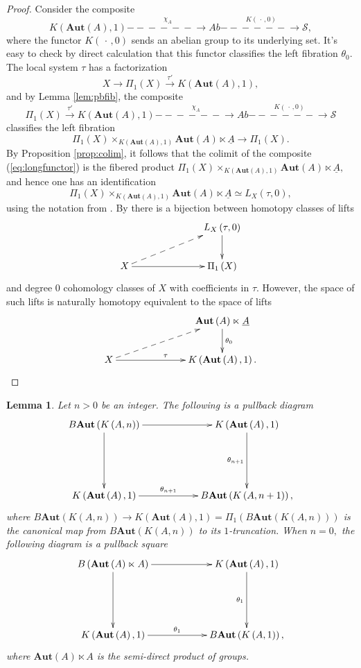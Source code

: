 \documentclass[12pt]{amsart}
\newtheorem{lemma}[dummy]{Lemma}
\theoremstyle{definition}
\newcommand{\cS}{\mathcal{S}}
\def\blank{\mspace{3mu}\cdot\mspace{3mu}}
\def\Aut{\mathbf{Aut}}
\def\longlongrightarrow{-\!\!\!-\!\!\!-\!\!\!-\!\!\!-\!\!\!-\!\!\!\longrightarrow}
\begin{document}
\begin{proof}
Consider the composite
$$K\left(\Aut\left(A\right),1\right) \stackrel{\chi_A}{\longlongrightarrow} Ab \stackrel{K\left(\blank,0\right)}{\longlongrightarrow} \cS,$$ where the functor $K\left(\blank,0\right)$ sends an abelian group to its underlying set. It's easy to check by direct calculation that this functor classifies the left fibration $\theta_0.$ The local system $\tau$ has a factorization
$$X \to \Pi_1\left(X\right) \stackrel{\tau'}{\longrightarrow} K\left(\Aut\left(A\right),1\right),$$ and by Lemma \ref{lem:pbfib}, the composite
\begin{equation}\label{eq:longfunctor}
\Pi_1\left(X\right) \stackrel{\tau'}{\longrightarrow} K\left(\Aut\left(A\right),1\right) \stackrel{\chi_A}{\longlongrightarrow} Ab \stackrel{K\left(\blank,0\right)}{\longlongrightarrow} \cS
\end{equation}
classifies the left fibration $$\Pi_1\left(X\right) \times_{K\left(\Aut\left(A\right),1\right) } \Aut\left(A\right) \ltimes \underline{A} \to \Pi_1\left(X\right).$$ By Proposition \ref{prop:colim}, it follows that the colimit of the composite (\ref{eq:longfunctor}) is the fibered product $\Pi_1\left(X\right) \times_{K\left(\Aut\left(A\right),1\right) } \Aut\left(A\right) \ltimes \underline{A},$ and hence one has an identification
$$\Pi_1\left(X\right) \times_{K\left(\Aut\left(A\right),1\right) } \Aut\left(A\right) \ltimes \underline{A} \simeq L_{X}\left(\tau,0\right),$$ using the notation from \cite[Definition 3.1]{coh}. By \cite[Corollary 4.6]{coh} there is a bijection between homotopy classes of lifts
$$\xymatrix@C=2.5cm{& L_X\left(\tau,0\right) \ar[d]\\
X \ar[r] \ar@{-->}[ru]& \Pi_1\left(X\right)}$$
and degree $0$ cohomology classes of $X$ with coefficients in $\tau.$ However, the space of such lifts is naturally homotopy equivalent to the space of lifts
$$\xymatrix@C=2.5cm{&  \Aut\left(A\right) \ltimes \underline{A} \ar^-{\theta_0}[d]\\
X \ar[r]^{\tau} \ar@{-->}[ru]& K\left(\Aut\left(A\right),1\right).}$$
\end{proof}

\begin{lemma}\label{lem:univpb}
Let $n>0$ be an integer. The following is a pullback diagram
$$\xymatrix@R=2cm@C=2cm{B\Aut\left(K\left(A,n\right)\right) \ar[d] \ar[r] & K\left(\Aut\left(A\right),1\right) \ar[d]_-{\theta_{n+1}} \\
K\left(\Aut\left(A\right),1\right) \ar[r]^-{\theta_{n+1}} & B\Aut\left(K\left(A,n+1\right)\right),}$$
where $B\Aut\left(K\left(A,n\right)\right) \to K\left(\Aut\left(A\right),1\right) =\Pi_1\left(B\Aut\left(K\left(A,n\right)\right)\right)$ is the canonical map from $B\Aut\left(K\left(A,n\right)\right)$ to its $1$-truncation. When $n=0,$ the following diagram is a pullback square
$$\xymatrix@R=2cm@C=2cm{B\left(\Aut\left(A\right)\ltimes A\right) \ar[d] \ar[r] & K\left(\Aut\left(A\right),1\right) \ar[d]_-{\theta_{1}} \\
K\left(\Aut\left(A\right),1\right) \ar[r]^-{\theta_{1}} & B\Aut\left(K\left(A,1\right)\right),}$$ where $\Aut\left(A\right)\ltimes A$ is the semi-direct product of groups.
\end{lemma}
\end{document}
